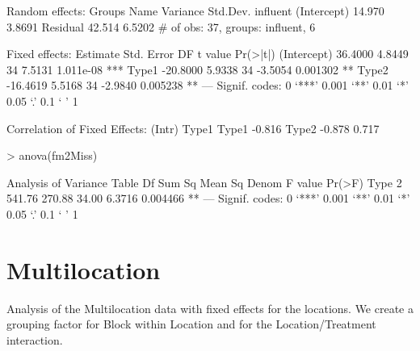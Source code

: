 \documentclass[12pt]{article}
\begin{document}
\begin{Schunk}
\begin{Soutput}
Random effects:
 Groups   Name        Variance Std.Dev.
 influent (Intercept) 14.970   3.8691  
 Residual             42.514   6.5202  
# of obs: 37, groups: influent, 6

Fixed effects:
            Estimate Std. Error DF t value  Pr(>|t|)    
(Intercept)  36.4000     4.8449 34  7.5131 1.011e-08 ***
Type1       -20.8000     5.9338 34 -3.5054  0.001302 ** 
Type2       -16.4619     5.5168 34 -2.9840  0.005238 ** 
---
Signif. codes:  0 `***' 0.001 `**' 0.01 `*' 0.05 `.' 0.1 ` ' 1 

Correlation of Fixed Effects:
      (Intr) Type1 
Type1 -0.816       
Type2 -0.878  0.717
\end{Soutput}
\begin{Sinput}
> anova(fm2Miss)
\end{Sinput}
\begin{Soutput}
Analysis of Variance Table
     Df Sum Sq Mean Sq  Denom F value   Pr(>F)   
Type  2 541.76  270.88  34.00  6.3716 0.004466 **
---
Signif. codes:  0 `***' 0.001 `**' 0.01 `*' 0.05 `.' 0.1 ` ' 1 
\end{Soutput}
\end{Schunk}

\section{Multilocation}
\label{sec:Multilocation}

Analysis of the Multilocation data with fixed effects for the
locations.  We create a grouping factor for Block within Location and
for the Location/Treatment interaction.
\end{document}
